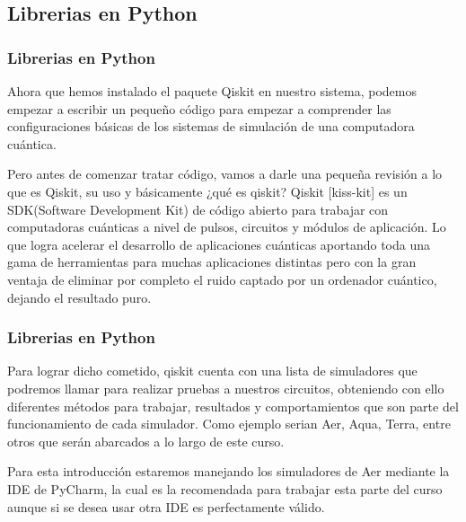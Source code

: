 \documentclass[spanish]{beamer}
\begin{document}
\subsection{Librerias en Python}
\begin{frame}
\frametitle{Librerias en Python} 
Ahora que hemos instalado el paquete Qiskit en nuestro sistema, podemos empezar a escribir un pequeño código para empezar a comprender las configuraciones básicas de los sistemas de simulación de una computadora cuántica.

Pero antes de comenzar tratar código, vamos a darle una pequeña revisión a lo que es Qiskit, su uso y básicamente ¿qué es qiskit? Qiskit [kiss-kit] es un SDK(Software Development Kit) de código abierto para trabajar con computadoras cuánticas a nivel de pulsos, circuitos y módulos de aplicación. Lo que logra acelerar el desarrollo de aplicaciones cuánticas aportando toda una gama de herramientas para muchas aplicaciones distintas pero con la gran ventaja de eliminar por completo el ruido captado por un ordenador cuántico, dejando el resultado puro.

\end{frame} 
\begin{frame}
\frametitle{Librerias en Python} 
Para lograr dicho cometido, qiskit cuenta con una lista de simuladores que podremos llamar para realizar pruebas a nuestros circuitos, obteniendo con ello diferentes métodos para trabajar, resultados y comportamientos que son parte del funcionamiento de cada simulador. Como ejemplo serian Aer, Aqua, Terra, entre otros que serán abarcados a lo largo de este curso.

Para esta introducción estaremos manejando los simuladores de Aer mediante la IDE de PyCharm, la cual es la recomendada para trabajar esta parte del curso aunque si se desea usar otra IDE es perfectamente válido.

\end{frame} 
\end{document}

